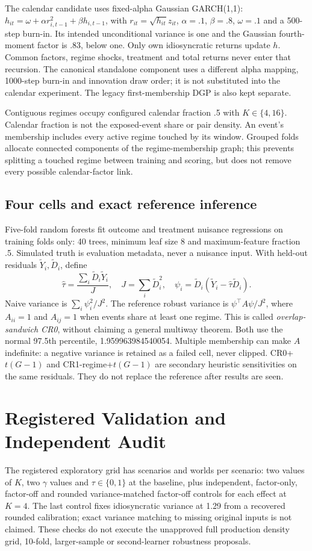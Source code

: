 \documentclass[conference]{IEEEtran}
\begin{document}
The calendar candidate uses fixed-alpha Gaussian GARCH(1,1): $h_{it}=\omega+\alpha r_{i,t-1}^2+\beta h_{i,t-1}$, with $r_{it}=\sqrt{h_{it}}z_{it}$, $\alpha=.1$, $\beta=.8$, $\omega=.1$ and a 500-step burn-in. Its intended unconditional variance is one and the Gaussian fourth-moment factor is .83, below one. Only own idiosyncratic returns update $h$. Common factors, regime shocks, treatment and total returns never enter that recursion. The canonical standalone component uses a different alpha mapping, 1000-step burn-in and innovation draw order; it is not substituted into the calendar experiment. The legacy first-membership DGP is also kept separate.

Contiguous regimes occupy configured calendar fraction .5 with $K\in\{4,16\}$. Calendar fraction is not the exposed-event share or pair density. An event's membership includes every active regime touched by its window. Grouped folds allocate connected components of the regime-membership graph; this prevents splitting a touched regime between training and scoring, but does not remove every possible calendar-factor link.

\subsection{Four cells and exact reference inference}
Five-fold random forests fit outcome and treatment nuisance regressions on training folds only: 40 trees, minimum leaf size 8 and maximum-feature fraction .5. Simulated truth is evaluation metadata, never a nuisance input. With held-out residuals $\widetilde Y_i,\widetilde D_i$, define
\begin{equation}
\widehat\tau=\frac{\sum_i\widetilde D_i\widetilde Y_i}{J},\quad
J=\sum_i\widetilde D_i^2,\quad
\psi_i=\widetilde D_i(\widetilde Y_i-\widehat\tau\widetilde D_i).
\end{equation}
Naive variance is $\sum_i\psi_i^2/J^2$. The reference robust variance is $\psi^\top A\psi/J^2$, where $A_{ii}=1$ and $A_{ij}=1$ when events share at least one regime. This is called \emph{overlap-sandwich CR0}, without claiming a general multiway theorem. Both use the normal 97.5th percentile, 1.959963984540054. Multiple membership can make $A$ indefinite: a negative variance is retained as a failed cell, never clipped. CR0+$t(G-1)$ and CR1-regime+$t(G-1)$ are secondary heuristic sensitivities on the same residuals. They do not replace the reference after results are seen.

\section{Registered Validation and Independent Audit}
The registered exploratory grid has \NumScenarios{} scenarios and \Reps{} worlds per scenario: two values of $K$, two $\gamma$ values and $\tau\in\{0,1\}$ at the baseline, plus independent, factor-only, factor-off and rounded variance-matched factor-off controls for each effect at $K=4$. The last control fixes idiosyncratic variance at 1.29 from a recovered rounded calibration; exact variance matching to missing original inputs is not claimed. These checks do not execute the unapproved full production density grid, 10-fold, larger-sample or second-learner robustness proposals.
\end{document}
